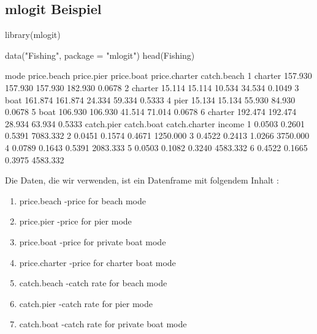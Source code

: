 \documentclass[a4paper,twoside]{tufte-book}\usepackage[]{graphicx}\usepackage[]{color}
\begin{document}
\begin{appendices}
\subsection{mlogit Beispiel}

\begin{Schunk}
\begin{Sinput}
library(mlogit)
 
data("Fishing", package = "mlogit")
head(Fishing)
\end{Sinput}
\begin{Soutput}
     mode price.beach price.pier price.boat price.charter catch.beach
1 charter     157.930    157.930    157.930       182.930      0.0678
2 charter      15.114     15.114     10.534        34.534      0.1049
3    boat     161.874    161.874     24.334        59.334      0.5333
4    pier      15.134     15.134     55.930        84.930      0.0678
5    boat     106.930    106.930     41.514        71.014      0.0678
6 charter     192.474    192.474     28.934        63.934      0.5333
  catch.pier catch.boat catch.charter   income
1     0.0503     0.2601        0.5391 7083.332
2     0.0451     0.1574        0.4671 1250.000
3     0.4522     0.2413        1.0266 3750.000
4     0.0789     0.1643        0.5391 2083.333
5     0.0503     0.1082        0.3240 4583.332
6     0.4522     0.1665        0.3975 4583.332
\end{Soutput}
\end{Schunk}

Die Daten, die wir verwenden, ist ein Datenframe mit folgendem Inhalt :

\begin{enumerate}
\setlength\itemsep{-0.5em}
\item price.beach -price for beach mode

\item price.pier -price for pier mode

\item price.boat -price for private boat mode

\item price.charter -price for charter boat mode

\item catch.beach -catch rate for beach mode

\item catch.pier -catch rate for pier mode

\item catch.boat -catch rate for private boat mode


\end{enumerate}
\end{appendices}
\end{document}
